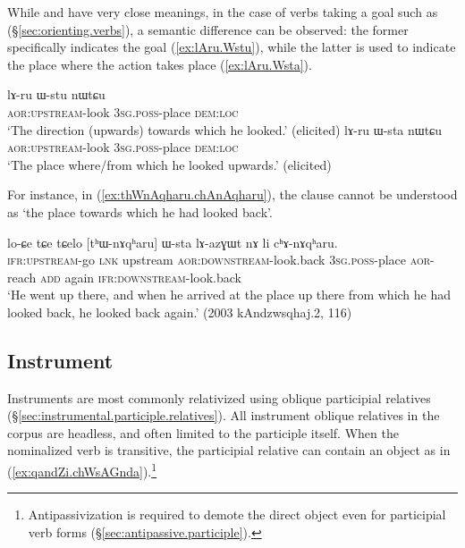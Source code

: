 While  and  have very close meanings, in the case of verbs taking a goal such as  (§\ref{sec:orienting.verbs}), a semantic difference can be observed: the former specifically indicates the goal (\ref{ex:lAru.Wstu}), while the latter is used to indicate the place where the action takes place (\ref{ex:lAru.Wsta}).

\begin{exe}
\ex 
\begin{xlist}
\ex \label{ex:lAru.Wstu}
\gll lɤ-ru ɯ-stu nɯtɕu \\
\textsc{aor}:\textsc{upstream}-look \textsc{3sg}.\textsc{poss}-place \textsc{dem}:\textsc{loc} \\
\glt `The direction (upwards) towards which he looked.' (elicited)
\ex \label{ex:lAru.Wsta}
\gll lɤ-ru ɯ-sta nɯtɕu \\
\textsc{aor}:\textsc{upstream}-look \textsc{3sg}.\textsc{poss}-place \textsc{dem}:\textsc{loc} \\
\glt `The place where/from which he looked upwards.' (elicited)
\end{xlist}
\end{exe}
 
For instance, in (\ref{ex:thWnAqharu.chAnAqharu}), the clause  cannot be understood as `the place towards which he had looked back'.

\begin{exe}
\ex \label{ex:thWnAqharu.chAnAqharu}
 \gll lo-ɕe tɕe tɕelo [tʰɯ-nɤqʰaru] ɯ-sta lɤ-azɣɯt nɤ li cʰɤ-nɤqʰaru. \\
\textsc{ifr}:\textsc{upstream}-go \textsc{lnk} upstream \textsc{aor}:\textsc{downstream}-look.back \textsc{3sg}.\textsc{poss}-place \textsc{aor}-reach \textsc{add} again \textsc{ifr}:\textsc{downstream}-look.back  \\
\glt `He went up there, and when he arrived at the place up there from which he had looked back, he looked back again.' (2003 kAndzwsqhaj.2, 116)
 \end{exe}
 

 
\subsection{Instrument} \label{sec:instrument.relativization}
Instruments are most commonly relativized using oblique participial relatives (§\ref{sec:instrumental.participle.relatives}). All instrument oblique relatives in the corpus are headless, and often limited to the participle itself. When the nominalized verb is transitive, the participial relative can contain an object  as in (\ref{ex:qandZi.chWsAGnda}).\footnote{Antipassivization is required to demote the direct object even for participial verb forms (§\ref{sec:antipassive.participle}). }

